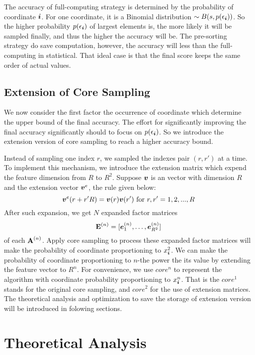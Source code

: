 \documentclass[letterpaper]{article}
\newcommand{\V}[1]{{\bm{{\MakeLowercase{#1}}}}}
\newcommand{\VnC}[3]{\V{#1}^{(#2)}_{#3}}
\newcommand{\M}[1]{{\bm{\mathbf{\MakeUppercase{#1}}}}}
\begin{document}
The accuracy of full-computing strategy is determined by the probability of coordinate $\V{i}$.
For one coordinate, it is a Binomial distribution  $\sim B(s,p(\epsilon_{\V{i}}))$.
So the higher probability $p(\epsilon_{\V{i}})$ of largest elements is,
the more likely it will be sampled finally,
and thus the higher the accuracy will be.
The pre-sorting strategy do save computation,
however, the accuracy will less than the full-computing in statistical.
That ideal case is that the final score keeps the same order of actual values.

\subsection{Extension of Core Sampling}

We now consider the first factor the occurrence of coordinate
which determine the upper bound of the final accuracy.
The effort for significantly improving the final accuracy significantly
should to focus on $p(\epsilon_{\V{i}})$.
So we introduce the extension version of core sampling to reach a higher accuracy bound.

Instead of sampling one index $r$, we sampled the indexes pair $(r,r')$ at a time.
To implement this mechanism,
we introduce the extension matrix which expend the feature dimension from $R$ to $R^2$.
Suppose $\V{v}$ is an vector with dimension $R$ and the extension vector $\V{v}^e$,
the rule given below:
\[
    \V{v}^e(r+r'R) = \V{v}(r)\V{v}(r')\ {\rm for\ }r,r' = {1,2,...,R}
\]
After such expansion, we get $N$ expanded factor matrices
\begin{equation}\label{eq:ExtensionMatrices}
    \M{E}^{(n)}=[\VnC{e}{n}{1},\ldots,\VnC{e}{n}{R^2}]
\end{equation}
of each $\M{A}^{(n)}$.
Apply core sampling to process these expanded factor matrices
will make the probability of coordinate proportioning to $x_{\V{i}}^2$.
We can make the probability of coordinate proportioning to $n$-the power the its value
by extending the feature vector to $R^n$.
For convenience, we use $core^n$ to
represent the algorithm with coordinate probability proportioning to $x^n_{\V{i}}$.
That is the $core^1$ stands for the original core sampling, and $core^2$ for the use of extension matrices.
The theoretical analysis and optimization to save the storage of extension version will be
introduced in folowing sections.

\section{Theoretical Analysis}
\end{document}
